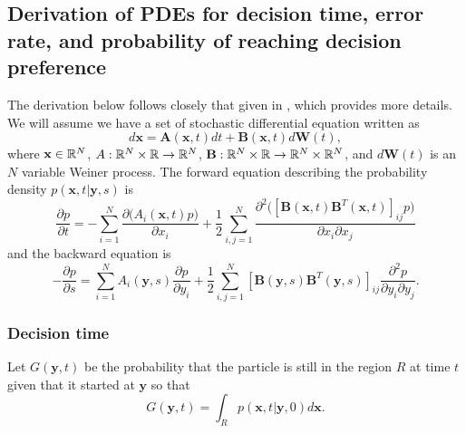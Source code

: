 \documentclass{article}
\newcommand{\mb}{\mathbf}
\begin{document}
\subsection{Derivation of PDEs for decision time, error rate, and probability of reaching decision preference \label{pdes_deriv}}
The derivation below follows closely that given in \cite{Gardiner:2009fk}, which provides more details.
We will assume we have a set of stochastic differential equation written as
\begin{equation}
d{\mathbf x} ={\mb A}({\mb x},t)dt+{\mb B}({\mb x},t)d{\mb W}(t), \label{sde}
\end{equation}
where ${\mb x}\in\R^N$, $A:{\mathbb{R}}^N\times {\mathbb{R}}\to{\mathbb{R}}^N$, ${\mb B}:\R^N\times\R\to\R^N\times\R^N$, and $d{\mb W}(t)$ is an $N$ variable Weiner process. The forward equation describing the probability density $p({\mb x},t|{\mb y},s)$ is 
\begin{equation}
\frac{\partial p}{\partial t} =-\sum_{i=1}^N\frac{\partial \big(A_i({\mb x},t)p\big)}{\partial x_i}+\frac{1}{2}\sum_{i,j=1}^N\frac{\partial^2\big([{\mb B}({\mb x},t){\mb B}^T({\mb x},t)]_{ij}p\big)}{\partial x_i\partial x_j} \label{forward}
\end{equation}
and the backward equation is 
\begin{equation}
-\frac{\partial p}{\partial s}=\sum_{i=1}^NA_i({\mb y},s)\frac{\partial p}{\partial y_i}+\frac{1}{2}\sum_{i,j=1}^N[{\mb B}({\mb y},s){\mb B}^T({\mb y},s)]_{ij}\frac{\partial^2 p}{\partial y_i\partial y_j}. \label{backward}
\end{equation}

\subsubsection{Decision time }
Let $G({\mathbf y},t)$ be the probability that the particle is still in the region $R$ at time $t$ given that it started at ${\mathbf y}$ so that $$G({\mathbf y},t)=\int_Rp({\mathbf x},t|{\mathbf y},0)d{\mathbf x}.$$  
\end{document}
